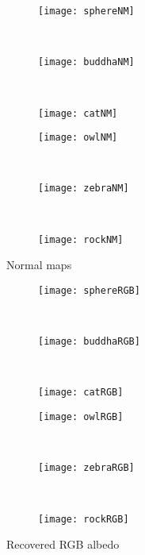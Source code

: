 \documentclass{paper}
\begin{document}
\begin{figure*}[h!]
    \centering
    \begin{subfigure}[]{0.33\textwidth}
        \centering
        \texttt{[image: sphereNM]}
    \end{subfigure}%
    ~ 
    \begin{subfigure}[]{0.33\textwidth}
        \centering
        \texttt{[image: buddhaNM]}
    \end{subfigure}%
    ~ 
    \begin{subfigure}[]{0.33\textwidth}
        \centering
        \texttt{[image: catNM]}
    \end{subfigure}
        \begin{subfigure}[]{0.33\textwidth}
        \centering
        \texttt{[image: owlNM]}
    \end{subfigure}%
    ~ 
    \begin{subfigure}[]{0.33\textwidth}
        \centering
        \texttt{[image: zebraNM]}
    \end{subfigure}%
    ~ 
    \begin{subfigure}[]{0.33\textwidth}
        \centering
        \texttt{[image: rockNM]}
    \end{subfigure}

    \caption{Normal maps}    
\label{fig:NM}

\end{figure*}


\begin{figure*}[h!]
    \centering
    \begin{subfigure}[]{0.33\textwidth}
        \centering
        \texttt{[image: sphereRGB]}
    \end{subfigure}%
    ~ 
    \begin{subfigure}[]{0.33\textwidth}
        \centering
        \texttt{[image: buddhaRGB]}
    \end{subfigure}%
    ~ 
    \begin{subfigure}[]{0.33\textwidth}
        \centering
        \texttt{[image: catRGB]}
    \end{subfigure}
        \begin{subfigure}[]{0.33\textwidth}
        \centering
        \texttt{[image: owlRGB]}
    \end{subfigure}%
    ~ 
    \begin{subfigure}[]{0.33\textwidth}
        \centering
        \texttt{[image: zebraRGB]}
    \end{subfigure}%
    ~ 
    \begin{subfigure}[]{0.33\textwidth}
        \centering
        \texttt{[image: rockRGB]}
    \end{subfigure}

    \caption{Recovered RGB albedo}    
\label{fig:RGB}
\end{figure*}
\end{document}
